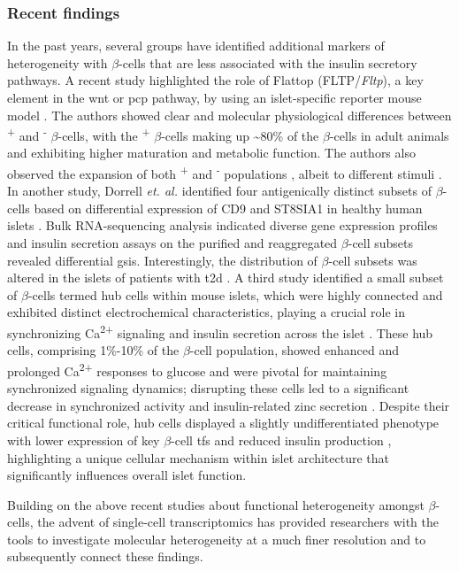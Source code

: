 \subsubsection{Recent findings}
In the past years, several groups have identified additional markers of heterogeneity with $\beta$-cells that are less associated with the insulin secretory pathways. A recent study highlighted the role of Flattop (FLTP/\textit{Fltp}), a key element in the \gls{wnt} or \gls{pcp} pathway, by using an islet-specific  reporter mouse model \textbf{\cite{bader_identification_2016,roscioni_impact_2016}}. The authors showed clear and molecular physiological differences between \textsuperscript{+} and \textsuperscript{-} $\beta$-cells, with the \textsuperscript{+} $\beta$-cells making up \textasciitilde80\% of the $\beta$-cells in adult animals and exhibiting higher maturation and metabolic function. The authors also observed the expansion of both \textsuperscript{+} and \textsuperscript{-} populations , albeit to different stimuli \textbf{\cite{bader_identification_2016}}. In another study, Dorrell \textit{et. al.} identified four antigenically distinct subsets of $\beta$-cells based on differential expression of CD9 and ST8SIA1 in healthy human islets \textbf{\cite{dorrell_human_2016}}. Bulk RNA-sequencing analysis indicated diverse gene expression profiles and insulin secretion assays on the purified and reaggregated $\beta$-cell subsets revealed differential \gls{gsis}. Interestingly, the distribution of $\beta$-cell subsets was altered in the islets of patients with \gls{t2d} \textbf{\cite{dorrell_human_2016}}. A third study identified a small subset of $\beta$-cells termed hub cells within mouse islets, which were highly connected and exhibited distinct electrochemical characteristics, playing a crucial role in synchronizing Ca\textsuperscript{2+} signaling and insulin secretion across the islet \textbf{\cite{johnston_beta_2016}}. These hub cells, comprising 1\%-10\% of the $\beta$-cell population, showed enhanced and prolonged Ca\textsuperscript{2+} responses to glucose and were pivotal for maintaining synchronized signaling dynamics; disrupting these cells led to a significant decrease in synchronized activity and insulin-related zinc secretion \textbf{\cite{johnston_beta_2016}}. Despite their critical functional role, hub cells displayed a slightly undifferentiated phenotype with lower expression of key $\beta$-cell \glspl{tf} and reduced insulin production \textbf{\cite{johnston_beta_2016}}, highlighting a unique cellular mechanism within islet architecture that significantly influences overall islet function.\\
\par Building on the above recent studies about functional heterogeneity amongst $\beta$-cells, the advent of single-cell transcriptomics has provided researchers with the tools to investigate molecular heterogeneity at a much finer resolution and to subsequently connect these findings.

